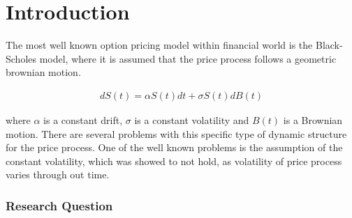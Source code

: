 \documentclass[main.tex]{subfiles}
\begin{document}
\setlength{\abovedisplayskip}{-15pt}
\setlength{\belowdisplayskip}{0pt}
\setlength{\abovedisplayshortskip}{0pt}
\setlength{\belowdisplayshortskip}{0pt}
\allowdisplaybreaks[2]

\chapter{Introduction}
The most well known option pricing model within financial world is the Black-Scholes model, where it is assumed that the price process follows a geometric brownian motion.

\begin{align*}
dS(t) = \alpha S(t) dt + \sigma S(t) dB(t)
\end{align*}

where $\alpha$ is a constant drift, $\sigma$ is a constant volatility and $B(t)$ is a Brownian motion. 
There are several problems with this specific type of dynamic structure for the price process. One of the well known problems is the assumption of the constant volatility, which was showed to not hold, as volatility of price process varies through out time.

\subsection*{Research Question}
\end{document}
